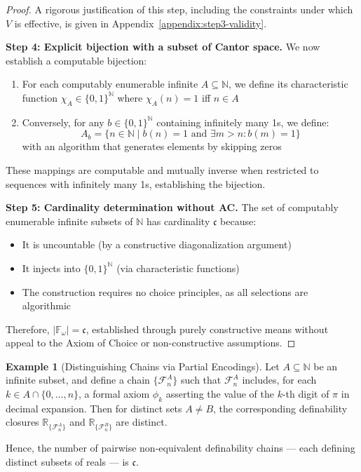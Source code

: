 \documentclass[12pt]{article}
\theoremstyle{definition}
\newtheorem{example}{Example}[section]
\theoremstyle{plain}
\theoremstyle{remark}
\begin{document}
\begin{proof}
\smallskip
A rigorous justification of this step, including the constraints under which \( V \) is effective, is given in Appendix~\ref{appendix:step3-validity}.

\textbf{Step 4: Explicit bijection with a subset of Cantor space.}
We now establish a computable bijection:
\begin{enumerate}
    \item For each computably enumerable infinite \( A \subseteq \mathbb{N} \), we define its characteristic function \( \chi_A \in \{0,1\}^\mathbb{N} \) where \( \chi_A(n) = 1 \) iff \( n \in A \)
    \item Conversely, for any \( b \in \{0,1\}^\mathbb{N} \) containing infinitely many 1s, we define:
    \begin{equation}
        A_b = \{n \in \mathbb{N} \mid b(n)=1 \text{ and } \exists m>n: b(m)=1\}
    \end{equation}
    with an algorithm that generates elements by skipping zeros
\end{enumerate}

These mappings are computable and mutually inverse when restricted to sequences with infinitely many 1s, establishing the bijection.

\textbf{Step 5: Cardinality determination without AC.}
The set of computably enumerable infinite subsets of \( \mathbb{N} \) has cardinality \( \mathfrak{c} \) because:
\begin{itemize}
    \item It is uncountable (by a constructive diagonalization argument)
    \item It injects into \( \{0,1\}^\mathbb{N} \) (via characteristic functions)
    \item The construction requires no choice principles, as all selections are algorithmic
\end{itemize}

Therefore, \( |\mathbb{F}_\omega| = \mathfrak{c} \), established through purely constructive means without appeal to the Axiom of Choice or non-constructive assumptions.
\end{proof}

\begin{example}[Distinguishing Chains via Partial Encodings]
Let \( A \subseteq \mathbb{N} \) be an infinite subset, and define a chain \( \{\mathcal{F}_n^A\} \) such that \( \mathcal{F}_n^A \) includes, for each \( k \in A \cap \{0, \dots, n\} \), a formal axiom \( \phi_k \) asserting the value of the \( k \)-th digit of \( \pi \) in decimal expansion. Then for distinct sets \( A \neq B \), the corresponding definability closures \( \mathbb{R}_{\{\mathcal{F}_n^A\}} \) and \( \mathbb{R}_{\{\mathcal{F}_n^B\}} \) are distinct.

Hence, the number of pairwise non-equivalent definability chains — each defining distinct subsets of reals — is \( \mathfrak{c} \).
\end{example}
\end{document}
